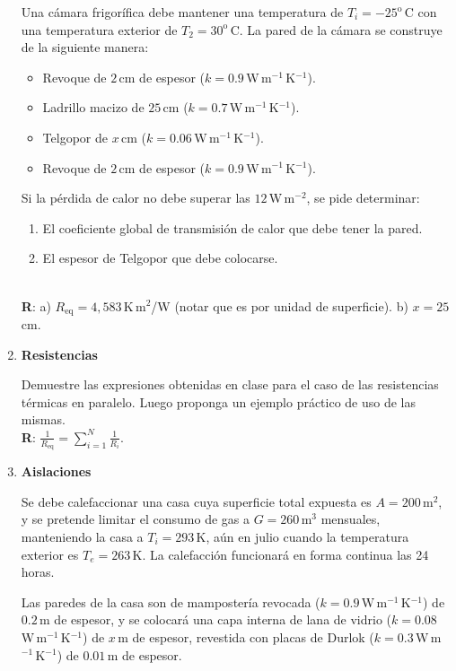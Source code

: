 \documentclass[a4paper,12pt]{article}
\begin{document}
\begin{enumerate}
		Una cámara frigorífica debe mantener una temperatura de
		$T_i=-25^\mathrm{o}$\,C con una temperatura exterior de
		$T_2=30^\mathrm{o}$\,C. La pared de la cámara se construye de la
		siguiente manera:
		\begin{itemize}
			\item Revoque de $2$\,cm de espesor
				($k=0.9$\,W\,m$^{-1}$\,K$^{-1}$).
			\item Ladrillo macizo de $25$\,cm ($k=0.7$\,W\,m$^{-1}$\,K$^{-1}$).
			\item Telgopor de $x$\,cm ($k=0.06$\,W\,m$^{-1}$\,K$^{-1}$).
			\item Revoque de $2$\,cm de espesor
				($k=0.9$\,W\,m$^{-1}$\,K$^{-1}$).
		\end{itemize}
		Si la pérdida de calor no debe superar las $12$\,W\,m$^{-2}$, se pide
		determinar:
		\begin{enumerate}
			\item El coeficiente global de transmisión de calor que debe tener
				la pared.
			\item El espesor de Telgopor que debe colocarse.
		\end{enumerate}
		\\{\bf{R}}: a) $R_{\mathrm{eq}}=4,583$\,K\,m$^2$/W (notar que es por
		unidad de superficie). b) $x=25$\,cm. 

	\item {\bf{Resistencias}}

		Demuestre las expresiones obtenidas en clase para el caso de las
		resistencias térmicas en paralelo. Luego proponga un ejemplo práctico
		de uso de las mismas. 
		\\{\bf{R}}: $\frac{1}{R_{\mathrm{eq}}}=\sum\limits_{i=1}^N \frac{1}{R_i}$. 
	
	\item {\bf{Aislaciones}}
		
		Se debe calefaccionar una casa cuya superficie total expuesta es
		$A=200$\,m$^2$, y se pretende limitar el consumo de gas a
		$G=260$\,m$^3$ mensuales, manteniendo la casa a $T_i=293$\,K, aún en
		julio cuando la temperatura exterior es $T_e=263$\,K. La calefacción
		funcionará en forma continua las 24 horas.
		
		Las paredes de la casa son de mampostería revocada
		($k=0.9$\,W\,m$^{-1}$\,K$^{-1}$) de $0.2$\,m de espesor, y se colocará
		una capa interna de lana de vidrio ($k=0.08$\,W\,m$^{-1}$\,K$^{-1}$) de
		$x$\,m de espesor, revestida con placas de Durlok
		($k=0.3$\,W\,m$^{-1}$\,K$^{-1}$) de $0.01$\,m de espesor.
		

\end{enumerate}
\end{document}
